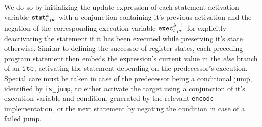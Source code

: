 We do so by initializing the update expression of each statement activation variable $\texttt{stmt}^k_{t, pc}$ with a conjunction containing it's previous activation and the negation of the corresponding execution variable $\texttt{exec}^{k - 1}_{t, pc}$ for explicitly deactivating the statement if it has been executed while preserving it's state otherwise.
Similar to defining the successor of register states, each preceding program statement then embeds the expression's current value in the \emph{else} branch of an $\texttt{ite}$, activating the statement depending on the predecessor's execution.
Special care must be taken in case of the predecessor being a conditional jump, identified by \texttt{is_jump}, to either activate the target using a conjunction of it's execution variable and condition, generated by the relevant \texttt{encode} implementation, or the next statement by negating the condition in case of a failed jump.

